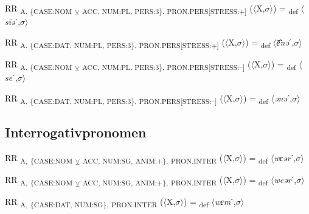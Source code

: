 {\begin{exe}
 RR \textsubscript{A, \{CASE:NOM} \textsubscript{${\veebar}$}\textsubscript{ ACC, NUM:PL, PERS:3\}, PRON.PERS[STRESS:+]} ($\langle$X,$\sigma $$\rangle$) = \textsubscript{def} $\langle$\textit{s\=iə}ˊ,$\sigma $$\rangle$
\end{exe}

\begin{exe}
 RR \textsubscript{A, \{CASE:DAT, NUM:PL, PERS:3\}, PRON.PERS[STRESS:+]} ($\langle$X,$\sigma $$\rangle$) = \textsubscript{def} $\langle$\textit{\=e͂nə}ˊ,$\sigma $$\rangle$
\end{exe}

\begin{exe}
 RR \textsubscript{A, \{CASE:NOM} \textsubscript{${\veebar}$}\textsubscript{ ACC, NUM:PL, PERS:3\}, PRON.PERS[STRESS:–]} ($\langle$X,$\sigma $$\rangle$) = \textsubscript{def} $\langle$\textit{se}ˊ,$\sigma $$\rangle$
\end{exe}

\begin{exe}
 RR \textsubscript{A, \{CASE:DAT, NUM:PL, PERS:3\}, PRON.PERS[STRESS:–]} ($\langle$X,$\sigma $$\rangle$) = \textsubscript{def} $\langle$\textit{ənə}ˊ,$\sigma $$\rangle$
\end{exe}

\subsection{Interrogativpronomen}

\begin{exe}
 RR \textsubscript{A,} \textsubscript{\{CASE:NOM} \textsubscript{${\veebar}$}\textsubscript{ ACC, NUM:SG, ANIM:+\},} \textsubscript{PRON.INTER} ($\langle$X,$\sigma $$\rangle$) = \textsubscript{def} $\langle$\textit{wɛər}ˊ,$\sigma $$\rangle$
\end{exe}

\begin{exe}
 RR \textsubscript{A,} \textsubscript{\{CASE:NOM} \textsubscript{${\veebar}$}\textsubscript{ ACC, NUM:SG, ANIM:+\},} \textsubscript{PRON.INTER} ($\langle$X,$\sigma $$\rangle$) = \textsubscript{def} $\langle$\textit{weər}ˊ,$\sigma $$\rangle$
\end{exe}

\begin{exe}
 RR \textsubscript{A,} \textsubscript{\{CASE:DAT, NUM:SG\},} \textsubscript{PRON.INTER} ($\langle$X,$\sigma $$\rangle$) = \textsubscript{def} $\langle$\textit{wɛm}ˊ,$\sigma $$\rangle$
\end{exe}

}
